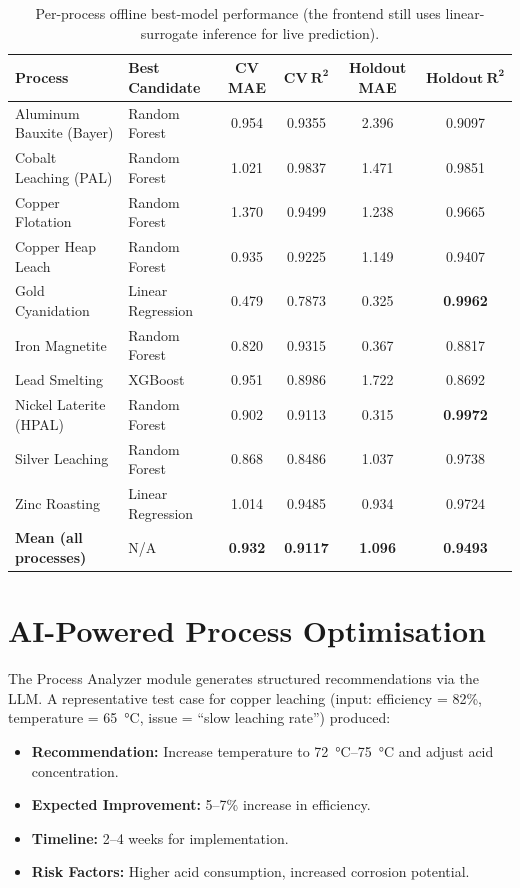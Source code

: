 \documentclass[12pt,a4paper]{report}
\begin{document}
\begin{table}[H]
\centering
\caption{Per-process offline best-model performance (the frontend still uses linear-surrogate inference for live prediction).}
\label{tab:model_results}
\footnotesize
\begin{tabular}{@{} l l c c c c @{}}
\toprule
\textbf{Process} & \textbf{Best Candidate} & \textbf{CV MAE} & $\boldsymbol{CV\ R^2}$ & \textbf{Holdout MAE} & $\boldsymbol{Holdout\ R^2}$ \\
\midrule
Aluminum Bauxite (Bayer)  & Random Forest    & 0.954 & 0.9355 & 2.396 & 0.9097 \\
Cobalt Leaching (PAL)     & Random Forest    & 1.021 & 0.9837 & 1.471 & 0.9851 \\
Copper Flotation          & Random Forest    & 1.370 & 0.9499 & 1.238 & 0.9665 \\
Copper Heap Leach         & Random Forest    & 0.935 & 0.9225 & 1.149 & 0.9407 \\
Gold Cyanidation          & Linear Regression & 0.479 & 0.7873 & 0.325 & \textbf{0.9962} \\
Iron Magnetite            & Random Forest    & 0.820 & 0.9315 & 0.367 & 0.8817 \\
Lead Smelting             & XGBoost          & 0.951 & 0.8986 & 1.722 & 0.8692 \\
Nickel Laterite (HPAL)    & Random Forest    & 0.902 & 0.9113 & 0.315 & \textbf{0.9972} \\
Silver Leaching           & Random Forest    & 0.868 & 0.8486 & 1.037 & 0.9738 \\
Zinc Roasting             & Linear Regression & 1.014 & 0.9485 & 0.934 & 0.9724 \\
\midrule
\textbf{Mean (all processes)} & N/A & \textbf{0.932} & \textbf{0.9117} & \textbf{1.096} & \textbf{0.9493} \\
\bottomrule
\end{tabular}
\end{table}

\section{AI-Powered Process Optimisation}

The Process Analyzer module generates structured recommendations via the LLM. A representative test case for copper leaching (input: efficiency = 82\%, temperature = \SI{65}{\degreeCelsius}, issue = ``slow leaching rate'') produced:

\begin{itemize}[nosep]
  \item \textbf{Recommendation:} Increase temperature to \SI{72}{\degreeCelsius}–\SI{75}{\degreeCelsius} and adjust acid concentration.
  \item \textbf{Expected Improvement:} 5–7\% increase in efficiency.
  \item \textbf{Timeline:} 2–4 weeks for implementation.
  \item \textbf{Risk Factors:} Higher acid consumption, increased corrosion potential.
\end{itemize}
\end{document}
